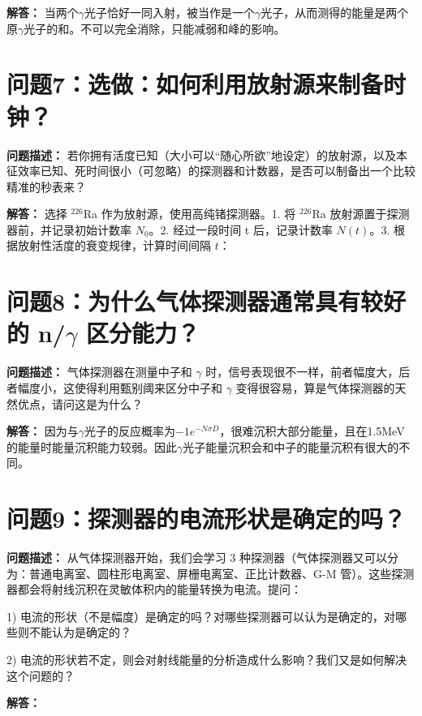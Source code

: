 \documentclass{article}
\begin{document}
\textbf{解答：} 当两个$\gamma$光子恰好一同入射，被当作是一个$\gamma$光子，从而测得的能量是两个原$\gamma$光子的和。不可以完全消除，只能减弱和峰的影响。

\section*{问题7：选做：如何利用放射源来制备时钟？}
\label{sec:prob7}

\textbf{问题描述：} 若你拥有活度已知（大小可以“随心所欲”地设定）的放射源，以及本征效率已知、死时间很小（可忽略）的探测器和计数器，是否可以制备出一个比较精准的秒表来？

\textbf{解答：} 选择 $^{226}$Ra 作为放射源，使用高纯锗探测器。1. 将 $^{226}$Ra 放射源置于探测器前，并记录初始计数率 $N_0$。2. 经过一段时间 t 后，记录计数率 $N(t)$。3. 根据放射性活度的衰变规律，计算时间间隔 $t$：

\section{问题8：为什么气体探测器通常具有较好的 n/$\gamma$ 区分能力？}
\label{sec:prob8}

\textbf{问题描述：} 气体探测器在测量中子和 $\gamma$ 时，信号表现很不一样，前者幅度大，后者幅度小，这使得利用甄别阈来区分中子和 $\gamma$ 变得很容易，算是气体探测器的天然优点，请问这是为什么？

\textbf{解答：} 因为与$\gamma$光子的反应概率为$-1e^{-N\sigma D}$，很难沉积大部分能量，且在1.5MeV的能量时能量沉积能力较弱。因此$\gamma$光子能量沉积会和中子的能量沉积有很大的不同。

\section{问题9：探测器的电流形状是确定的吗？}
\label{sec:prob9}

\textbf{问题描述：} 从气体探测器开始，我们会学习 3 种探测器（气体探测器又可以分为：普通电离室、圆柱形电离室、屏栅电离室、正比计数器、G-M 管）。这些探测器都会将射线沉积在灵敏体积内的能量转换为电流。提问：

1) 电流的形状（不是幅度）是确定的吗？对哪些探测器可以认为是确定的，对哪些则不能认为是确定的？

2) 电流的形状若不定，则会对射线能量的分析造成什么影响？我们又是如何解决这个问题的？

\textbf{解答：}
\end{document}

